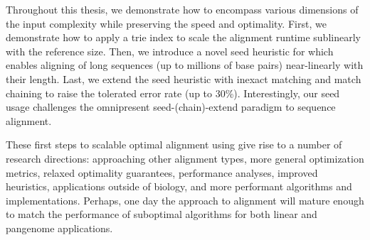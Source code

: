 Throughout this thesis, we demonstrate how to encompass various dimensions of
the input complexity while preserving the speed and optimality. First, we
demonstrate how to apply a trie index to scale the alignment runtime sublinearly
with the reference size. Then, we introduce a novel seed heuristic for \A which
enables aligning of long sequences (up to millions of base pairs) near-linearly
with their length. Last, we extend the seed heuristic with inexact matching and
match chaining to raise the tolerated error rate (up to 30\%). Interestingly,
our seed usage challenges the omnipresent seed-(chain)-extend paradigm to
sequence alignment.

These first steps to scalable optimal alignment using \A give rise to a number
of research directions: approaching other alignment types, more general
optimization metrics, relaxed optimality guarantees, performance analyses,
improved heuristics, applications outside of biology, and more performant
algorithms and implementations. Perhaps, one day the \A approach to alignment
will mature enough to match the performance of suboptimal algorithms for both
linear and pangenome applications.